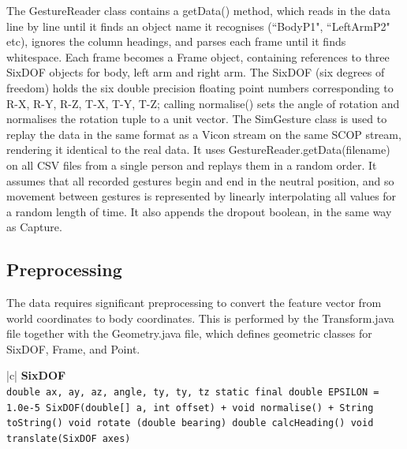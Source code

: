 \documentclass[12pt,a4,notitlepage]{report}
\renewcommand{\_}{\texttt{\symbol{95}}}
\newcommand{\<}{\texttt{\symbol{60}}}
\renewcommand{\>}{\texttt{\symbol{62}}}
\newcommand{\class}[1]{\textbf{#1}}
\newcommand{\variable}[1]{\texttt{#1}}
\begin{document}
The GestureReader class contains a getData() method, which reads in the data line by line until it finds an object name it recognises (``BodyP1", ``LeftArmP2" etc), ignores the column headings, and parses each frame until it finds whitespace. Each frame becomes a Frame object, containing references to three SixDOF objects for body, left arm and right arm. The SixDOF (six degrees of freedom) holds the six double precision floating point numbers corresponding to \<R-X\>, \<R-Y\>, \<R-Z\>, \<T-X\>, \<T-Y\>, \<T-Z\>; calling normalise() sets the angle of rotation and normalises the rotation tuple to a unit vector.
The SimGesture class is used to replay the data in the same format as a Vicon stream on the same SCOP stream, rendering it identical to the real data. It uses  GestureReader.getData(filename) on all CSV files from a single person and replays them in a random order. It assumes that all recorded gestures begin and end in the neutral position, and so movement between gestures is represented by linearly interpolating all values for a random length of time. It also appends the dropout boolean, in the same way as Capture.

\subsection{Preprocessing}

The data requires significant preprocessing to convert the feature vector from world coordinates to body coordinates. This is performed by the Transform.java file together with the Geometry.java file, which defines geometric classes for SixDOF, Frame, and Point.

\begin{tabular}{|c|} \hline 
\class{SixDOF} \\ \hline
{}
{\variable{double ax, ay, az, angle, ty, ty, tz \newline
  static final double EPSILON = 1.0e-5 \newline
  SixDOF(double[] a, int offset) \newline
  + void normalise() \newline
  + String toString() \newline
  void rotate (double bearing) \newline
  double calcHeading() \newline
  void translate(SixDOF axes)
} } \\ \hline
\end{tabular}
\end{document}
